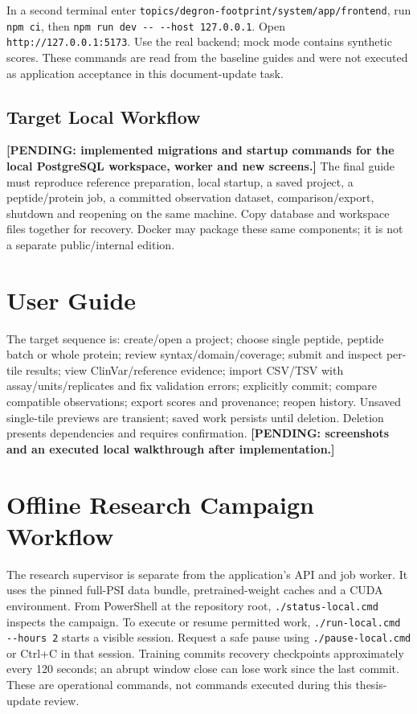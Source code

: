 In a second terminal enter \nolinkurl{topics/degron-footprint/system/app/frontend}, run
\nolinkurl{npm ci}, then \nolinkurl{npm run dev -- --host 127.0.0.1}. Open
\nolinkurl{http://127.0.0.1:5173}. Use the real backend; mock mode contains synthetic scores.
These commands are read from the baseline guides and were not executed as application acceptance
in this document-update task.

\subsection{Target Local Workflow}
\textbf{[PENDING: implemented migrations and startup commands for the local PostgreSQL workspace,
worker and new screens.]}
The final guide must reproduce reference preparation, local startup, a saved project, a peptide/protein
job, a committed observation dataset, comparison/export, shutdown and reopening on the same machine.
Copy database and workspace files together for recovery. Docker may package these same components;
it is not a separate public/internal edition.

\section{User Guide}
The target sequence is: create/open a project; choose single peptide, peptide batch or whole protein;
review syntax/domain/coverage; submit and inspect per-tile results; view ClinVar/reference evidence;
import CSV/TSV with assay/units/replicates and fix validation errors; explicitly commit; compare compatible
observations; export scores and provenance; reopen history. Unsaved single-tile previews are transient;
saved work persists until deletion. Deletion presents dependencies and requires confirmation.
\textbf{[PENDING: screenshots and an executed local walkthrough after implementation.]}

\section{Offline Research Campaign Workflow}\label{sec:research-local-guide}
The research supervisor is separate from the application's API and job worker. It uses the pinned
full-PSI data bundle, pretrained-weight caches and a CUDA environment. From PowerShell at the
repository root, \nolinkurl{./status-local.cmd} inspects the campaign. To execute or resume permitted
work, \nolinkurl{./run-local.cmd --hours 2} starts a visible session. Request a safe pause using
\nolinkurl{./pause-local.cmd} or Ctrl+C in that session. Training commits recovery checkpoints
approximately every 120 seconds; an abrupt window close can lose work since the last commit.
These are operational commands, not commands executed during this thesis-update review.

